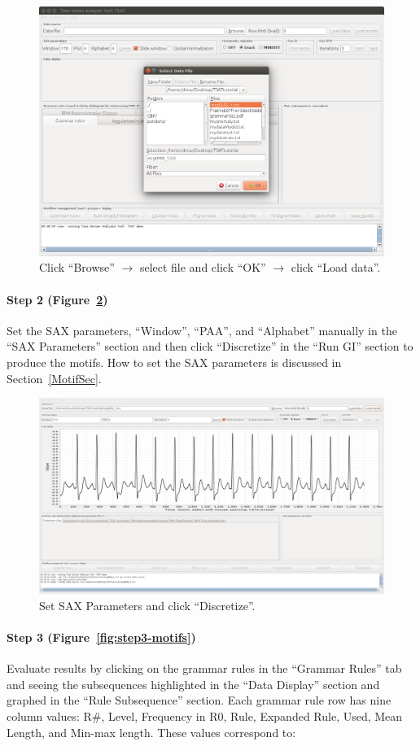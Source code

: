 \documentclass[letterpaper, 12pt]{article}
\begin{document}
\begin{figure}[H]
	\centering
	\includegraphics[width=0.7\linewidth]{pictures/motifguide/step1-browse}
	\caption{Click ``Browse'' $\rightarrow$ select file and click ``OK'' $\rightarrow$ click ``Load data''.}
	\label{fig:step1-browse}
\end{figure}


\paragraph{Step 2 (Figure~\ref{fig:step2-loaded})} Set the SAX parameters, ``Window'', ``PAA'', and ``Alphabet'' manually in the ``SAX Parameters'' section and then click ``Discretize'' in the ``Run GI'' section to produce the motifs.  How to set the SAX parameters is discussed in Section~\ref{MotifSec}.

\begin{figure}[H]
	\centering
	\includegraphics[width=0.7\linewidth]{pictures/motifguide/Step2-loaded}
	\caption{Set SAX Parameters and click ``Discretize''.}
	\label{fig:step2-loaded}
\end{figure}


\paragraph{Step 3 (Figure~\ref{fig:step3-motifs})} Evaluate results by clicking on the grammar rules in the ``Grammar Rules'' tab and seeing the subsequences highlighted in the ``Data Display'' section and graphed in the ``Rule Subsequence'' section.  Each grammar rule row has nine column values: R\#, Level, Frequency in R0, Rule, Expanded Rule, Used, Mean Length, and Min-max length.  These values correspond to:
\end{document}
